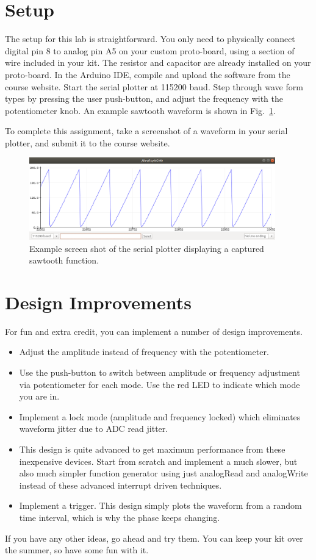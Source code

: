 \documentclass[12pt]{article}
\begin{document}
\section{Setup}

The setup for this lab is straightforward.  You only need to
physically connect digital pin 8 to analog pin A5 on your custom
proto-board, using a section of wire included in your kit.  The
resistor and capacitor are already installed on your proto-board.  In
the Arduino IDE, compile and upload the software from the course
website.  Start the serial plotter at 115200 baud.  Step through wave
form types by pressing the user push-button, and adjust the frequency
with the potentiometer knob.  An example sawtooth waveform is shown in
Fig.~\ref{fig:trace}.

To complete this assignment, take a screenshot of a waveform in your
serial plotter, and submit it to the course website.

\begin{figure}[htbp]
\begin{center}
\includegraphics[width=0.95\textwidth]{figs/trace.png}
\end{center}
\caption{Example screen shot of the serial plotter displaying a captured sawtooth function.}
\label{fig:trace}
\end{figure}



\section{Design Improvements}

For fun and extra credit, you can implement a number of design improvements.
\begin{itemize}
\item Adjust the amplitude instead of frequency with the potentiometer.
\item Use the push-button to switch between amplitude or frequency adjustment via potentiometer for each mode.  Use the red LED to indicate which mode you are in.
\item Implement a lock mode (amplitude and frequency locked) which eliminates waveform jitter due to ADC read jitter.
\item This design is quite advanced to get maximum performance from these inexpensive devices.  Start from scratch and implement a much slower, but also much simpler function generator using just analogRead and analogWrite instead of these advanced interrupt driven techniques.
\item Implement a trigger.  This design simply plots the waveform from a random time interval, which is why the phase keeps changing.
\end{itemize}
If you have any other ideas, go ahead and try them.  You can keep your kit over the summer, so have some fun with it.
\end{document}
